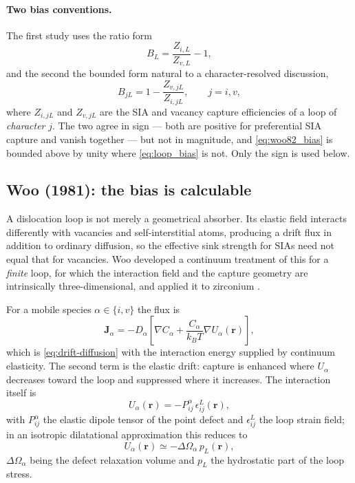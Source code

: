 \documentclass{article}
\begin{document}
\paragraph{Two bias conventions.} The first study uses the ratio form
\begin{equation}
    B_L=\frac{Z_{i,L}}{Z_{v,L}}-1 ,
    \label{eq:loop_bias}
\end{equation}
and the second the bounded form natural to a character-resolved discussion,
\begin{equation}
    B_{jL}=1-\frac{Z_{v,jL}}{Z_{i,jL}},
    \qquad j=i,v,
    \label{eq:woo82_bias}
\end{equation}
where $Z_{i,jL}$ and $Z_{v,jL}$ are the SIA and vacancy capture efficiencies of a
loop of \emph{character} $j$. The two agree in sign --- both are positive for
preferential SIA capture and vanish together --- but not in magnitude, and
\cref{eq:woo82_bias} is bounded above by unity where \cref{eq:loop_bias} is not.
Only the sign is used below.

\subsection{Woo (1981): the bias is calculable}

A dislocation loop is not merely a geometrical absorber. Its elastic field
interacts differently with vacancies and self-interstitial atoms, producing a
drift flux in addition to ordinary diffusion, so the effective sink strength for
SIAs need not equal that for vacancies. Woo developed a continuum treatment of
this for a \emph{finite} loop, for which the interaction field and the capture
geometry are intrinsically three-dimensional, and applied it to zirconium
\citep{woo1981sink}.

For a mobile species $\alpha\in\{i,v\}$ the flux is
\begin{equation}
    \bm J_{\alpha}
    =-D_{\alpha}\left[\nabla C_{\alpha}
       +\frac{C_{\alpha}}{k_BT}\nabla U_{\alpha}(\bm r)\right],
    \label{eq:woo_flux}
\end{equation}
which is \cref{eq:drift-diffusion} with the interaction energy supplied by
continuum elasticity. The second term is the elastic drift: capture is enhanced
where $U_\alpha$ decreases toward the loop and suppressed where it increases. The
interaction itself is
\begin{equation}
    U_{\alpha}(\bm r)=-P_{ij}^{\alpha}\,\epsilon_{ij}^{L}(\bm r),
    \label{eq:elastic_interaction}
\end{equation}
with $P^\alpha_{ij}$ the elastic dipole tensor of the point defect and
$\epsilon^L_{ij}$ the loop strain field; in an isotropic dilatational
approximation this reduces to
\begin{equation}
    U_{\alpha}(\bm r)\simeq-\Delta\Omega_{\alpha}\,p_L(\bm r),
    \label{eq:dilatation_interaction}
\end{equation}
$\Delta\Omega_\alpha$ being the defect relaxation volume and $p_L$ the
hydrostatic part of the loop stress.
\end{document}
